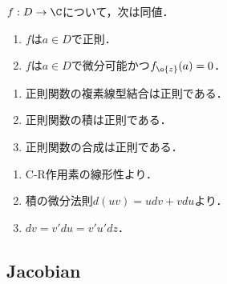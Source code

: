 \documentclass[uplatex, dvipdfmx]{jsreport}
\begin{document}
\begin{proposition}[微分作用素による特徴付け]
    $f:D\to\C$について，次は同値．
    \begin{enumerate}
        \item $f$は$a\in D$で正則．
        \item $f$は$a\in D$で微分可能かつ$f_{\o{z}}(a)=0$．
    \end{enumerate}
\end{proposition}

\begin{corollary}[正則性の遺伝]\mbox{}
    \begin{enumerate}
        \item 正則関数の複素線型結合は正則である．
        \item 正則関数の積は正則である．
        \item 正則関数の合成は正則である．
    \end{enumerate}
\end{corollary}
\begin{Proof}\mbox{}
    \begin{enumerate}
        \item C-R作用素の線形性より．
        \item 積の微分法則$d(uv)=udv+vdu$より．
        \item $dv=v'du=v'u'dz$．
    \end{enumerate}
\end{Proof}

\subsection{Jacobian}
\end{document}
